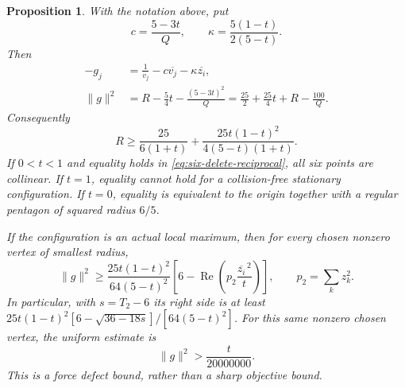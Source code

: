 \documentclass[11pt]{article}
\newtheorem{proposition}[theorem]{Proposition}
\theoremstyle{remark}
\numberwithin{equation}{section}
\begin{document}
\begin{proposition}\label{prop:noorigin-six-deletion}
With the notation above, put
\[
 c=\frac{5-3t}{Q},\qquad
 \kappa=\frac{5(1-t)}{2(5-t)}.
\]
Then
\begin{align}
 -g_j&=\frac1{v_j}-c\overline{v_j}
                         -\kappa\overline{z_i},\label{eq:six-delete-residual}\\
 \|g\|^2
 &=R-\frac54t-\frac{(5-3t)^2}{Q}
   =\frac{25}2+\frac{25}4t+R-\frac{100}{Q}.\label{eq:six-delete-norm}
\end{align}
Consequently
\begin{equation}\label{eq:six-delete-reciprocal}
 R\ge\frac{25}{6(1+t)}
       +\frac{25t(1-t)^2}{4(5-t)(1+t)}.
\end{equation}
If $0<t<1$ and equality holds in
\eqref{eq:six-delete-reciprocal}, all six points are collinear.
If $t=1$, equality cannot hold for a collision-free stationary
configuration. If $t=0$, equality is equivalent to the origin
together with a regular pentagon of squared radius $6/5$.

If the configuration is an actual local maximum, then for every
chosen nonzero vertex of smallest radius,
\[
 \|g\|^2\ge
 \frac{25t(1-t)^2}{64(5-t)^2}
 \left[6-\operatorname{Re}\left(p_2\frac{\overline{z_i}^{\,2}}t\right)\right],
 \qquad p_2=\sum_k z_k^2.
\]
In particular, with $s=T_2-6$ its right side is at least
$25t(1-t)^2[6-\sqrt{36-18s}]/[64(5-t)^2]$.
For this same nonzero chosen vertex, the uniform estimate is
\begin{equation}\label{eq:six-delete-uniform-gap}
                 \|g\|^2>\frac{t}{20000000}.
\end{equation}
This is a force defect bound, rather than a sharp objective bound.
\end{proposition}
\end{document}
